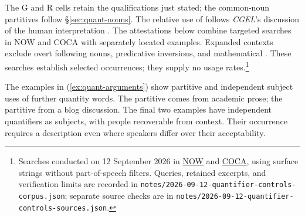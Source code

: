\documentclass[12pt]{article}
\begin{document}
The G and R cells retain the qualifications just stated; the common-noun partitives follow §\ref{sec:quant-nouns}. The relative use of  follows \textit{CGEL}'s discussion of the human interpretation \citep[414]{huddleston2002}. The attestations below combine targeted searches in NOW and COCA with separately located examples. Expanded contexts exclude overt following nouns, predicative inversions, and mathematical . These searches establish selected occurrences; they supply no usage rates.\footnote{Searches conducted on 12 September 2026 in \href{https://www.english-corpora.org/now/}{NOW} and \href{https://www.english-corpora.org/coca/}{COCA}, using surface strings without part-of-speech filters. Queries, retained excerpts, and verification limits are recorded in \nolinkurl{notes/2026-09-12-quantifier-controls-corpus.json}; separate source checks are in \nolinkurl{notes/2026-09-12-quantifier-controls-sources.json}.}

The examples in (\ref{ex:quant-arguments}) show partitive and independent subject uses of further quantity words. The  partitive comes from academic prose; the  partitive from a blog discussion. The final two examples have independent quantifiers as subjects, with people recoverable from context. Their occurrence requires a description even where speakers differ over their acceptability.
\end{document}
